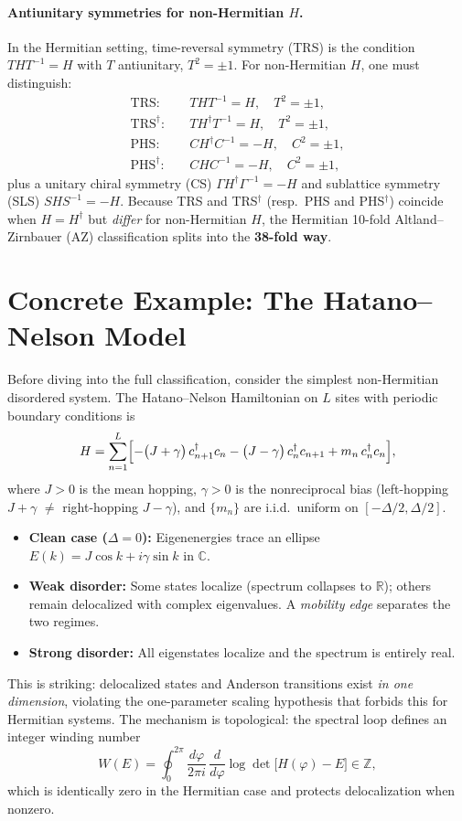\documentclass[11pt,a4paper]{article}
\begin{document}
\paragraph{Antiunitary symmetries for non-Hermitian $H$.}
In the Hermitian setting, time-reversal symmetry (TRS) is the condition $THT^{-1}=H$ with $T$ antiunitary, $T^2=\pm 1$.  For non-Hermitian $H$, one must distinguish:
\begin{align}
  \text{TRS:}\quad & THT^{-1} = H,\quad T^2=\pm 1, \label{eq:TRS}\\
  \text{TRS}^\dagger:\quad & TH^\dagger T^{-1} = H,\quad T^2=\pm 1, \label{eq:TRSdag}\\
  \text{PHS:}\quad & CH^\dagger C^{-1} = -H,\quad C^2=\pm 1, \label{eq:PHS}\\
  \text{PHS}^\dagger:\quad & CHC^{-1} = -H,\quad C^2=\pm 1, \label{eq:PHSdag}
\end{align}
plus a unitary chiral symmetry (CS) $\Gamma H^\dagger \Gamma^{-1}=-H$ and sublattice symmetry (SLS) $SHS^{-1}=-H$.  Because TRS and TRS$^\dagger$ (resp.\ PHS and PHS$^\dagger$) coincide when $H=H^\dagger$ but \emph{differ} for non-Hermitian $H$, the Hermitian 10-fold Altland--Zirnbauer (AZ) classification splits into the \textbf{38-fold way}.

\section{Concrete Example: The Hatano--Nelson Model}
Before diving into the full classification, consider the simplest non-Hermitian disordered system.
The Hatano--Nelson Hamiltonian on $L$ sites with periodic boundary conditions is
\[
  H = \sum_{n=1}^{L}\Bigl[-\bigl(J+\gamma\bigr)\,c_{n+1}^\dagger c_n
       - \bigl(J-\gamma\bigr)\,c_n^\dagger c_{n+1}
       + m_n\,c_n^\dagger c_n\Bigr],
\]
where $J>0$ is the mean hopping, $\gamma>0$ is the nonreciprocal bias (left-hopping $J+\gamma$ $\neq$ right-hopping $J-\gamma$), and $\{m_n\}$ are i.i.d.\ uniform on $[-\Delta/2,\Delta/2]$.

\begin{itemize}[nosep]
  \item \textbf{Clean case ($\Delta=0$):} Eigenenergies trace an ellipse $E(k)=J\cos k + i\gamma\sin k$ in $\mathbb{C}$.
  \item \textbf{Weak disorder:} Some states localize (spectrum collapses to $\mathbb{R}$); others remain delocalized with complex eigenvalues.  A \emph{mobility edge} separates the two regimes.
  \item \textbf{Strong disorder:} All eigenstates localize and the spectrum is entirely real.
\end{itemize}
This is striking: delocalized states and Anderson transitions exist \emph{in one dimension}, violating the one-parameter scaling hypothesis that forbids this for Hermitian systems.  The mechanism is topological: the spectral loop defines an integer winding number
\[
  W(E) = \oint_0^{2\pi}\frac{d\varphi}{2\pi i}\,\frac{d}{d\varphi}\log\det\bigl[H(\varphi)-E\bigr]\in\mathbb{Z},
\]
which is identically zero in the Hermitian case and protects delocalization when nonzero.
\end{document}
